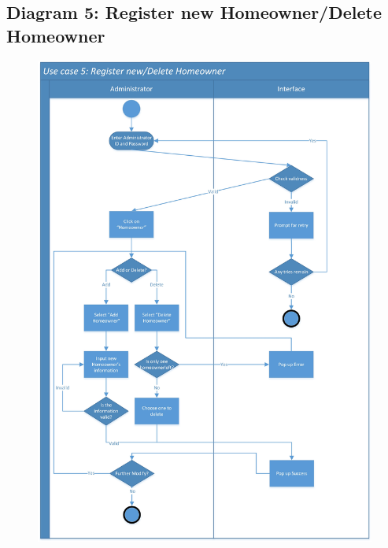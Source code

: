 \documentclass[twoside,11pt]{article}
\begin{document}
\subsection{Diagram 5: Register new Homeowner/Delete Homeowner}
\begin{figure}[H]
    \centering
    \includegraphics[width=0.9\columnwidth]{SwimLaneDiagram/Usecase_5.jpg}
\end{figure}
\newpage
\end{document}
